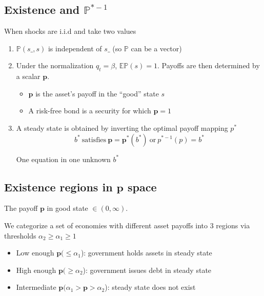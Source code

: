 \documentclass[12pt]{article}
\begin{document}
\subsection{Existence and $\mathbb{P}^{* -1}$}


 When shocks are i.i.d and take two values

  \begin{enumerate}

\item $\mathbb{P}(s\_,s)$ is independent of $s\_$ (so $\mathbb{P}$ can be a vector)
\item Under the normalization  $q_t = \beta$,  $\mathbb{E}\mathbb{P}(s)=1$.   Payoffs are then determined by a  scalar $\bm{p}$.
\begin{itemize}
 \item $\bm{p}$ is the asset's payoff in the ``good'' state $s$
 \item A risk-free bond is a security for which $\bm{p}=1$
\end{itemize}

\item A steady state is obtained by inverting the optimal payoff mapping $p^*$
\begin{equation*}
\label{eq-ss}
b^* \ \textrm{satisfies} \  \bm{p}=\bm{p}^*(b^*) \ \textrm{or} \ p^{* -1}(p) = b^*
\end{equation*}

One equation in one unknown $b^*$
\end{enumerate}

\subsection{Existence regions in $\bm{p}$ space}

The payoff $\bm{p}$ in good state
$\in (0,\infty)$.

We categorize a set of economies with different asset payoffs into 3 regions via thresholds $\alpha_2\geq\alpha_1\geq1$



  \begin{itemize}
   \item Low enough $\bm{p}(\leq \alpha_1$): government holds assets in steady state
   \item High enough $\bm{p} (\geq \alpha_2$): government  issues debt  in steady state
   \item Intermediate $\bm{p} (\alpha_1>\bm{p}>\alpha_2$): steady state does not exist
  \end{itemize}
\end{document}
